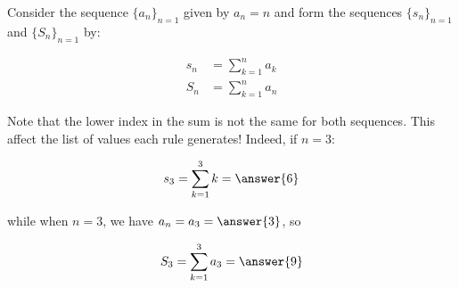 \documentclass{ximera}
\author{Jim Talamo}
\begin{document}
\begin{exercise}

Consider the sequence $\{a_n\}_{n=1}$ given by $a_n = n$ and form the sequences $\{s_n\}_{n=1}$ and $\{S_n\}_{n=1}$ by:

\begin{align*}
s_n &= \sum_{k=1}^n a_k \\
S_n &= \sum_{k=1}^n a_n
\end{align*}

\begin{multipleChoice}
\end{multipleChoice}

Note that the lower index in the sum is not the same for both sequences. This affect the list of values each rule generates!  Indeed, if $n=3$:

\[
s_3 = \sum_{k=1}^3 k = \answer{6}
\]

while when $n=3$, we have $a_n=a_3= \answer{3}$, so

\[
S_3 = \sum_{k=1}^{3} a_3  = \answer{9}
\]


\end{exercise}
\end{document}
